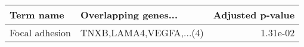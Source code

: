 \begin{tabular}{llr}
\toprule
     Term name &    Overlapping genes... &  Adjusted p-value \\
\midrule
Focal adhesion & TNXB,LAMA4,VEGFA,...(4) &          1.31e-02 \\
\bottomrule
\end{tabular}
